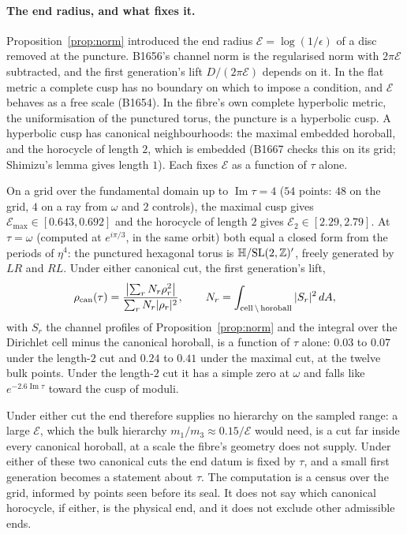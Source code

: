 \paragraph{The end radius, and what fixes it.}
Proposition~\ref{prop:norm} introduced the end radius $\mathcal E=\log(1/\epsilon)$ of a disc removed at the puncture. B1656's
channel norm is the regularised norm with $2\pi\mathcal E$ subtracted, and the first generation's lift $D/(2\pi\mathcal E)$ depends on
it. In the flat metric a complete cusp has no boundary on which to impose a condition, and $\mathcal E$ behaves as a free scale
(B1654). In the fibre's own complete hyperbolic metric, the uniformisation of the punctured torus, the puncture is a
hyperbolic cusp. A hyperbolic cusp has canonical neighbourhoods: the maximal embedded horoball, and the horocycle of
length $2$, which is embedded (B1667 checks this on its grid; Shimizu's lemma gives length $1$). Each fixes $\mathcal E$ as a
function of $\tau$ alone.

\begin{censuslaw}\label{cl:cusp}
On a grid over the fundamental domain up to $\operatorname{Im}\tau=4$ ($54$ points: $48$ on the grid, $4$ on a ray from
$\omega$ and $2$ controls), the maximal cusp gives
$\mathcal E_{\max}\in[0.643,0.692]$ and the horocycle of length $2$ gives $\mathcal E_2\in[2.29,2.79]$. At $\tau=\omega$ (computed at
$e^{i\pi/3}$, in the same orbit) both equal a
closed form from the periods of $\eta^4$: the punctured hexagonal torus is $\mathbb{H}/\mathrm{SL}(2,\mathbb{Z})'$, freely generated by $LR$ and
$RL$. Under either canonical cut, the first generation's lift,
\[
  \rho_{\rm can}(\tau)=\frac{\bigl|\sum_r N_r\rho_r^2\bigr|}{\sum_r N_r|\rho_r|^2},\qquad
  N_r=\int_{\text{cell}\,\setminus\,\text{horoball}}|S_r|^2\,dA,
\]
with $S_r$ the channel profiles of Proposition~\ref{prop:norm} and the integral over the Dirichlet cell minus the
canonical horoball, is a function of $\tau$ alone: $0.03$ to $0.07$ under the length-$2$ cut and $0.24$ to $0.41$ under the maximal
cut, at the twelve bulk points. Under the length-$2$ cut it has a simple zero at $\omega$ and falls like
$e^{-2.6\operatorname{Im}\tau}$ toward the cusp of moduli.
\end{censuslaw}

\noindent Under either cut the end therefore supplies no hierarchy on the sampled range: a large $\mathcal E$, which the bulk hierarchy $m_1/m_3\approx0.15/\mathcal E$ would
need, is a cut far inside every canonical horoball, at a scale the fibre's geometry does not supply. Under either of these two canonical cuts the end datum is fixed by
$\tau$, and a small first generation becomes a statement about $\tau$. The computation is a census over the grid, informed by points seen before its seal. It does not say which
canonical horocycle, if either, is the physical end, and it does not exclude other admissible ends.

